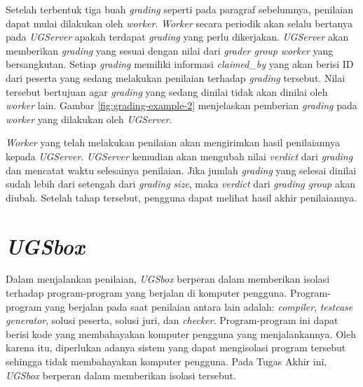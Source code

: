 \par Setelah terbentuk tiga buah \textit{grading} seperti pada paragraf sebelumnya, penilaian dapat mulai dilakukan oleh \textit{worker}. \textit{Worker} secara periodik akan selalu bertanya pada \textit{UGServer} apakah terdapat \textit{grading} yang perlu dikerjakan. \textit{UGServer} akan memberikan \textit{grading} yang sesuai dengan nilai dari \textit{grader group} \textit{worker} yang bersangkutan. Setiap \textit{grading} memiliki informasi \textit{claimed\_by} yang akan berisi ID dari peserta yang sedang melakukan penilaian terhadap \textit{grading} tersebut. Nilai tersebut bertujuan agar \textit{grading} yang sedang dinilai tidak akan dinilai oleh \textit{worker} lain. Gambar \ref{fig:grading-example-2} menjelaskan pemberian \textit{grading} pada \textit{worker} yang dilakukan oleh \textit{UGServer}.

\par \textit{Worker} yang telah melakukan penilaian akan mengirimkan hasil penilaiannya kepada \textit{UGServer}. \textit{UGServer} kemudian akan mengubah nilai \textit{verdict} dari \textit{grading} dan mencatat waktu selesainya penilaian. Jika jumlah \textit{grading} yang selesai dinilai sudah lebih dari setengah dari \textit{grading size}, maka \textit{verdict} dari \textit{grading group} akan diubah. Setelah tahap tersebut, pengguna dapat melihat hasil akhir penilaiannya. 





\section{\textit{UGSbox}}

\par Dalam menjalankan penilaian, \textit{UGSbox} berperan dalam memberikan isolasi terhadap program-program yang berjalan di komputer pengguna. Program-program yang berjalan pada saat penilaian antara lain adalah: \textit{compiler}, \textit{testcase generator}, solusi peserta, solusi juri, dan \textit{checker}. Program-program ini dapat berisi kode yang membahayakan komputer pengguna yang menjalankannya. Oleh karena itu, diperlukan adanya sistem yang dapat mengisolasi program tersebut sehingga tidak membahayakan komputer pengguna. Pada Tugas Akhir ini, \textit{UGSbox} berperan dalam memberikan isolasi tersebut.

